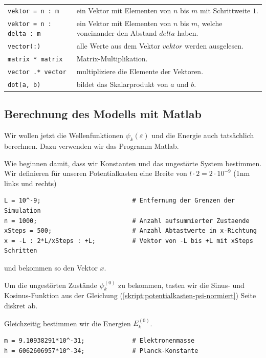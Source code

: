 \begin{refsection}
\begin{center}
	\begin{tabular}{lp{9cm}}
		\verb|vektor = n : m| & ein Vektor mit Elementen von $n$ bis $m$ mit Schrittweite $1$. \\
		\verb|vektor = n : delta : m| & ein Vektor mit Elementen von $n$ bis $m$, welche voneinander den Abstand $delta$ haben. \\
		\verb|vector(:)| & alle Werte aus dem Vektor $vektor$ werden ausgelesen. \\
		\verb|matrix * matrix| & Matrix-Multiplikation. \\
		\verb|vector .* vector| & multipliziere die Elemente der Vektoren. \\
		\verb|dot(a, b)| & bildet das Skalarprodukt von $a$ und $b$.
	\end{tabular}
\end{center}




\subsection{Berechnung des Modells mit Matlab}

Wir wollen jetzt die Wellenfunktionen $\psi_k(\varepsilon)$ und die Energie auch tats\"achlich berechnen.
Dazu verwenden wir das Programm Matlab.

Wie beginnen damit, dass wir Konstanten und das ungest\"orte System bestimmen.
Wir definieren f\"ur unseren Potentialkasten eine Breite von $l \cdot 2 = 2 \cdot 10^{-9}$ (1nm links und rechts)
\begin{lstlisting}[style=Matlab]
L = 10^-9;                         # Entfernung der Grenzen der Simulation
n = 1000;                          # Anzahl aufsummierter Zustaende
xSteps = 500;                      # Anzahl Abtastwerte in x-Richtung
x = -L : 2*L/xSteps : +L;          # Vektor von -L bis +L mit xSteps Schritten
\end{lstlisting}
und bekommen so den Vektor $x$.

Um die ungest\"orten Zust\"ande $\psi_k^{(0)}$ zu bekommen, tasten wir die Sinus- und Kosinus-Funktion 
aus der Gleichung (\ref{skript:potentialkasten-psi-normiert}) Seite \pageref{skript:potentialkasten-psi-normiert} diskret ab.

Gleichzeitig bestimmen wir die Energien $E_k^{(0)}$.
\begin{lstlisting}[style=Matlab]
m = 9.10938291*10^-31;             # Elektronenmasse
h = 6062606957*10^-34;             # Planck-Konstante


\end{lstlisting}
\end{refsection}
